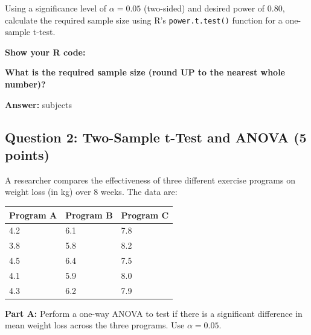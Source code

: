 \documentclass[11pt]{article}
\begin{document}
\vspace{0.3cm}

Using a significance level of $\alpha = 0.05$ (two-sided) and desired power of 0.80, calculate the required sample size using R's \texttt{power.t.test()} function for a one-sample t-test.

\vspace{0.3cm}

\textbf{Show your R code:}

\vspace{3cm}

\textbf{What is the required sample size (round UP to the nearest whole number)?}

\vspace{0.3cm}

\textbf{Answer:} \underline{\hspace{3cm}} subjects

\vspace{1cm}

\subsection*{Question 2: Two-Sample t-Test and ANOVA (5 points)}

A researcher compares the effectiveness of three different exercise programs on weight loss (in kg) over 8 weeks. The data are:

\vspace{0.3cm}

\begin{center}
\begin{tabular}{lll}
\toprule
Program A & Program B & Program C \\
\midrule
4.2 & 6.1 & 7.8 \\
3.8 & 5.8 & 8.2 \\
4.5 & 6.4 & 7.5 \\
4.1 & 5.9 & 8.0 \\
4.3 & 6.2 & 7.9 \\
\bottomrule
\end{tabular}
\end{center}

\vspace{0.3cm}

\textbf{Part A:} Perform a one-way ANOVA to test if there is a significant difference in mean weight loss across the three programs. Use $\alpha = 0.05$.

\vspace{0.3cm}
\end{document}
